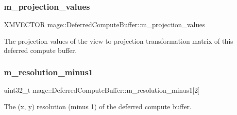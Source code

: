\subsubsection{\texorpdfstring{m\+\_\+projection\+\_\+values}{m\_projection\_values}}
{\footnotesize\ttfamily X\+M\+V\+E\+C\+T\+OR mage\+::\+Deferred\+Compute\+Buffer\+::m\+\_\+projection\+\_\+values}

The projection values of the view-\/to-\/projection transformation matrix of this deferred compute buffer. \hypertarget{structmage_1_1_deferred_compute_buffer_a7925ca812a2a0d2fb9a7e0daeb5fab38}{}\label{structmage_1_1_deferred_compute_buffer_a7925ca812a2a0d2fb9a7e0daeb5fab38} 
\subsubsection{\texorpdfstring{m\+\_\+resolution\+\_\+minus1}{m\_resolution\_minus1}}
{\footnotesize\ttfamily uint32\+\_\+t mage\+::\+Deferred\+Compute\+Buffer\+::m\+\_\+resolution\+\_\+minus1\mbox{[}2\mbox{]}}

The (x, y) resolution (minus 1) of the deferred compute buffer. 